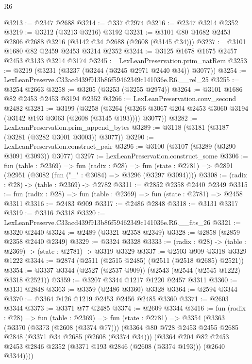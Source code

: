 \begin{lexlean}{R6}
\begin{coremodule}
@3213 := @2347 @2688
@3214 := @337 @2974
@3216 := @2347 @3214 @2352
@3219 := @3212 (@3213 @3216) @3192
@3231 := @3101 @80 @1682 @2453 @2806 @2688 @3216 (@3142 @34 @2688 (@2608 (@3145 @34)))
@3237 := @3101 @1680 @82 @2459 @2453 @3214 @2352
@3244 := @3125 @1678 @1675 @2457 @2453 @3133 @3214 @3174
@3245 := LexLeanPreservation.prim_natRem
@3253 := @3219 (@3231 (@3237 (@3244 (@3245 @2971 @2440 @34)) @3077))
@3254 := LexLeanPreserve.C33acd439f913b86f59462349c141036e.R6.__rel_25
@3255 := @3254 @2663
@3258 := @3205 (@3253 (@3255 @2974))
@3264 := @3101 @1686 @82 @2453 @2453 @3194 @2352
@3266 := LexLeanPreservation.conv_second @2482
@3281 := @3199
    (@3258
      (@3264 (@3266 @3067 @204 @2453 @3060 @3194 (@3142 @193 @3063 (@2608 (@3145 @193)))) @3077))
@3282 := LexLeanPreservation.prim_append_bytes
@3289 := @3118 (@3181 (@3187 (@3281 (@3282 @3001 @3003)) @3077))
@3290 := LexLeanPreservation.construct_pair
@3296 := @3100 (@3107 (@3289 (@3290 @3091 @3093)) @3077)
@3297 := LexLeanPreservation.construct_some
@3306 := fun (table : @2369) =>
  fun (radix : @28) =>
  fun (state : @2781) => @2891 (@2951 (@3082 (fun ("_" : @3084) => @3296 (@3297 @3094))))
@3308 := (radix : @28) -> (table : @2369) -> @2782
@3311 := @2852 @2358 @2440 @2349
@3315 := fun (radix : @28) => fun (table : @2369) => fun (state : @2781) => @2458 @3311
@3316 := @2483 @909
@3317 := @2486 @2848
@3318 := @3131 @3317
@3319 := @3316 @3318
@3320 := LexLeanPreserve.C33acd439f913b86f59462349c141036e.R6.__fits_26
@3321 := @3320 @2440
@3324 := @2489 (@3321 @2358 @2349)
@3328 := @2858 (@2859 @2358 @2440 @2349)
@3329 := @3324 @3328
@3333 := (radix : @28) -> (table : @2369) -> (state : @2781) -> @3319 @3329
@3337 := @2503 @909 @3318 @3329 @1222
@3344 := @2874 (@2511 (@2515 @2485) (@2511 (@2518 @2685) @2521))
@3354 := @3337 @3344 (@2527 (@2537 @909)) (@2543 (@2544 (@2545 @1222) @3318 @2521))
@3359 := @3207 @3344 @1217 @1220 @2457 @3311
@3360 := @3131 @2848
@3363 := @3359 (@2486 @3360) @3328
@3364 := @2594 @3344
@3370 := @3364 @126 @1219 @2453 @2456 @2485 @3360
@3371 := @2603 @3344
@3373 := @3371 @77 @2485
@3374 := @2609 @3344
@3416 := fun (radix : @28) =>
  fun (table : @2369) =>
  fun (state : @2781) =>
  @3354
    (@3363
      (@3370
        (@3373 (@2608 (@3374 @77)))
        (@3364
          @80
          @728
          @2453
          @2455
          @2685
          @2848
          (@3371 @34 @2685 (@2608 (@3374 @34)))
          (@3364
            @204
            @82
            @2453
            @2453
            @2846
            @2352
            (@3371 @193 @2846 (@2608 (@3374 @193)))
            (@2640 @3344))))

\end{coremodule}
\end{lexlean}
